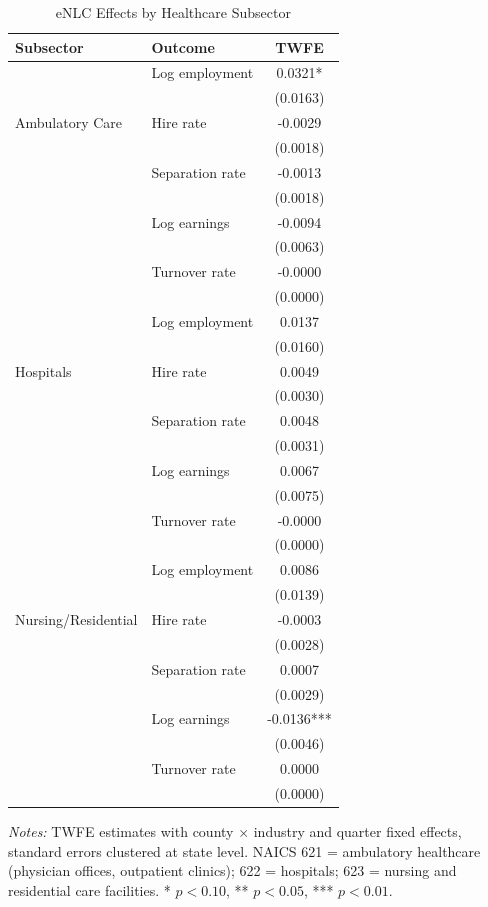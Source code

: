 
\begin{table}[H]
\centering
\caption{eNLC Effects by Healthcare Subsector}
\label{tab:subsector}
\begin{threeparttable}
\begin{tabular}{llc}
\toprule
Subsector & Outcome & TWFE \\
\midrule
\multirow{5}{*}{Ambulatory Care} & Log employment & 0.0321* \\
 & & (0.0163) \\
 & Hire rate & -0.0029 \\
 & & (0.0018) \\
 & Separation rate & -0.0013 \\
 & & (0.0018) \\
 & Log earnings & -0.0094 \\
 & & (0.0063) \\
 & Turnover rate & -0.0000 \\
 & & (0.0000) \\
\midrule
\multirow{5}{*}{Hospitals} & Log employment & 0.0137 \\
 & & (0.0160) \\
 & Hire rate & 0.0049 \\
 & & (0.0030) \\
 & Separation rate & 0.0048 \\
 & & (0.0031) \\
 & Log earnings & 0.0067 \\
 & & (0.0075) \\
 & Turnover rate & -0.0000 \\
 & & (0.0000) \\
\midrule
\multirow{5}{*}{Nursing/Residential} & Log employment & 0.0086 \\
 & & (0.0139) \\
 & Hire rate & -0.0003 \\
 & & (0.0028) \\
 & Separation rate & 0.0007 \\
 & & (0.0029) \\
 & Log earnings & -0.0136*** \\
 & & (0.0046) \\
 & Turnover rate & 0.0000 \\
 & & (0.0000) \\

\bottomrule
\end{tabular}
\begin{tablenotes}[flushleft]
\small
\item \textit{Notes:} TWFE estimates with county $\times$ industry and quarter fixed effects, standard errors clustered at state level. NAICS 621 = ambulatory healthcare (physician offices, outpatient clinics); 622 = hospitals; 623 = nursing and residential care facilities. * $p<0.10$, ** $p<0.05$, *** $p<0.01$.
\end{tablenotes}
\end{threeparttable}
\end{table}

